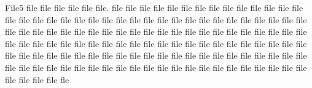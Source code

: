 File5 file file file file file file.
file file file file file file file file file file file file file file file file file file file file file file file file file file file file file file file file file file file file file file file file file file file file file file file file file file file file file file file file file file file file file file file file file file file file file file file file file file file file file file file file file file file file file file file file file file file file file file file file file file file file file file file file file file file file file file file file file file file file file file file file file file file file file file file file
\hspace{10pt}
fle
